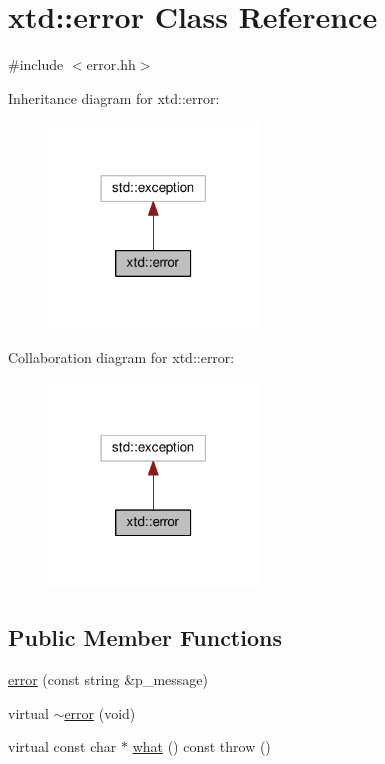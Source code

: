 \hypertarget{classxtd_1_1error}{\section{xtd\-:\-:error Class Reference}
\label{classxtd_1_1error}
}


{\ttfamily \#include $<$error.\-hh$>$}



Inheritance diagram for xtd\-:\-:error\-:
\nopagebreak
\begin{figure}[H]
\begin{center}
\leavevmode
\includegraphics[width=158pt]{classxtd_1_1error__inherit__graph}
\end{center}
\end{figure}


Collaboration diagram for xtd\-:\-:error\-:
\nopagebreak
\begin{figure}[H]
\begin{center}
\leavevmode
\includegraphics[width=158pt]{classxtd_1_1error__coll__graph}
\end{center}
\end{figure}
\subsection*{Public Member Functions}
\begin{DoxyCompactItemize}
\item 
\hyperlink{classxtd_1_1error_a4663571e50d7bcf512b353660b897a55}{error} (const string \&p\-\_\-message)
\item 
virtual \hyperlink{classxtd_1_1error_abeceaf42dfbad136014dc3921696e26f}{$\sim$error} (void)
\item 
virtual const char $\ast$ \hyperlink{classxtd_1_1error_a463ff8177561abd418c1f00aa2bcd154}{what} () const   throw ()
\end{DoxyCompactItemize}
